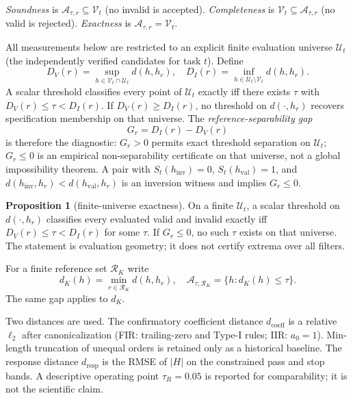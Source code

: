 \documentclass{article}
\begin{document}
\emph{Soundness} is $\mathcal{A}_{\tau,r}\subseteq\mathcal{V}_t$
(no invalid is accepted).
\emph{Completeness} is $\mathcal{V}_t\subseteq\mathcal{A}_{\tau,r}$
(no valid is rejected).
\emph{Exactness} is $\mathcal{A}_{\tau,r}=\mathcal{V}_t$.

All measurements below are restricted to an explicit finite
evaluation universe $\mathcal{U}_t$ (the independently verified
candidates for task $t$).
Define
\begin{equation}
D_V(r)=\sup_{h\in\mathcal{V}_t\cap\mathcal{U}_t}d(h,h_r),
\quad
D_I(r)=\inf_{h\in\mathcal{U}_t\setminus\mathcal{V}_t}d(h,h_r).
\label{eq:DVDI}
\end{equation}
A scalar threshold classifies every point of $\mathcal{U}_t$ exactly
iff there exists $\tau$ with $D_V(r)\le\tau<D_I(r)$.
If $D_V(r)\ge D_I(r)$, no threshold on $d(\cdot,h_r)$ recovers
specification membership on that universe.
The \emph{reference-separability gap}
\begin{equation}
G_r=D_I(r)-D_V(r)
\label{eq:Gr}
\end{equation}
is therefore the diagnostic: $G_r>0$ permits exact threshold
separation on $\mathcal{U}_t$; $G_r\le 0$ is an empirical
non-separability certificate on that universe, not a global
impossibility theorem.
A pair with $S_t(h_{\mathrm{inv}})=0$, $S_t(h_{\mathrm{val}})=1$, and
$d(h_{\mathrm{inv}},h_r)<d(h_{\mathrm{val}},h_r)$ is an inversion
witness and implies $G_r\le 0$.

\noindent\textbf{Proposition 1} (finite-universe exactness).
On a finite $\mathcal{U}_t$, a scalar threshold on $d(\cdot,h_r)$
classifies every evaluated valid and invalid exactly iff
$D_V(r)\le\tau<D_I(r)$ for some $\tau$.
If $G_r\le 0$, no such $\tau$ exists on that universe.
The statement is evaluation geometry; it does not certify extrema
over all filters.

For a finite reference set $\mathcal{R}_K$ write
\begin{equation}
d_K(h)=\min_{r\in\mathcal{R}_K}d(h,h_r),
\quad
\mathcal{A}_{\tau,\mathcal{R}_K}=\{h:d_K(h)\le\tau\}.
\label{eq:dK}
\end{equation}
The same gap applies to $d_K$.

Two distances are used.
The confirmatory coefficient distance $d_{\mathrm{coeff}}$ is a
relative $\ell_2$ after canonicalization (FIR: trailing-zero and
Type-I rules; IIR: $a_0=1$).
Min-length truncation of unequal orders is retained only as a
historical baseline.
The response distance $d_{\mathrm{resp}}$ is the RMSE of
$\lvert H\rvert$ on the constrained pass and stop bands.
A descriptive operating point $\tau_R=0.05$ is reported for
comparability; it is not the scientific claim.
\end{document}
